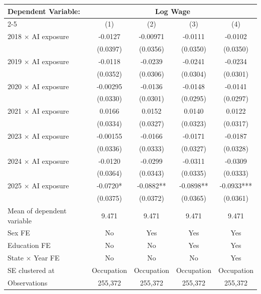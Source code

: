 \def\sym#1{\ifmmode^{#1}\else\(^{#1}\)\fi}
\begin{tabular}{l*{4}{c}}
\toprule
Dependent Variable: & \multicolumn{4}{c}{Log Wage} \\
\cmidrule(lr){2-5}
 & (1) & (2) & (3) & (4) \\
\midrule
2018 $\times$ AI exposure&     -0.0127   &    -0.00971   &     -0.0111   &     -0.0102   \\
            &    (0.0397)   &    (0.0356)   &    (0.0350)   &    (0.0350)   \\
2019 $\times$ AI exposure&     -0.0118   &     -0.0239   &     -0.0241   &     -0.0234   \\
            &    (0.0352)   &    (0.0306)   &    (0.0304)   &    (0.0301)   \\
2020 $\times$ AI exposure&    -0.00295   &     -0.0136   &     -0.0148   &     -0.0141   \\
            &    (0.0330)   &    (0.0301)   &    (0.0295)   &    (0.0297)   \\
2021 $\times$ AI exposure&      0.0166   &      0.0152   &      0.0140   &      0.0122   \\
            &    (0.0334)   &    (0.0327)   &    (0.0323)   &    (0.0317)   \\
2023 $\times$ AI exposure&    -0.00155   &     -0.0166   &     -0.0171   &     -0.0187   \\
            &    (0.0336)   &    (0.0333)   &    (0.0327)   &    (0.0328)   \\
2024 $\times$ AI exposure&     -0.0120   &     -0.0299   &     -0.0311   &     -0.0309   \\
            &    (0.0364)   &    (0.0343)   &    (0.0335)   &    (0.0333)   \\
2025 $\times$ AI exposure&     -0.0720*  &     -0.0882** &     -0.0898** &     -0.0933***\\
            &    (0.0375)   &    (0.0372)   &    (0.0365)   &    (0.0361)   \\
\midrule
Mean of dependent variable&       9.471   &       9.471   &       9.471   &       9.471   \\
Sex FE      &          No   &         Yes   &         Yes   &         Yes   \\
Education FE&          No   &          No   &         Yes   &         Yes   \\
State $\times$ Year FE&          No   &          No   &          No   &         Yes   \\
SE clustered at&  Occupation   &  Occupation   &  Occupation   &  Occupation   \\
Observations&     255,372   &     255,372   &     255,372   &     255,372   \\
\bottomrule
\end{tabular}
